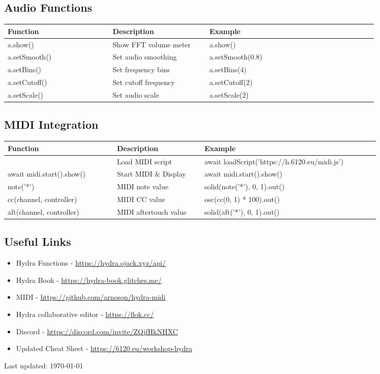 \documentclass[9pt,oneside]{amsart}
\begin{document}
\subsection*{Audio Functions}
\begin{tabular}{L{0.25\linewidth}L{0.23\linewidth}L{0.40\linewidth}}
\toprule
\textbf{Function} & \textbf{Description} & \textbf{Example} \\
\midrule
a.show() & Show FFT volume meter & a.show() \\
a.setSmooth() & Set audio smoothing & a.setSmooth(0.8) \\
a.setBins() & Set frequency bins & a.setBins(4) \\
a.setCutoff() & Set cutoff frequency & a.setCutoff(2) \\
a.setScale() & Set audio scale & a.setScale(2) \\
\bottomrule
\end{tabular}

\subsection*{MIDI Integration}
\begin{tabular}{L{0.25\linewidth}L{0.20\linewidth}L{0.40\linewidth}}
\toprule
\textbf{Function} & \textbf{Description} & \textbf{Example} \\
\midrule
 & Load MIDI script & await loadScript('https://h.6120.eu/midi.js') \\
await midi.start().show() & Start MIDI \& Display & await midi.start().show() \\
note('*') & MIDI note value & solid(note('*'), 0, 1).out() \\
cc(channel, controller) & MIDI CC value & osc(cc(0, 1) * 100).out() \\
aft(channel, controller) & MIDI aftertouch value & solid(aft('*'), 0, 1).out() \\
\bottomrule
\end{tabular}

\subsection*{Useful Links}
\begin{itemize}
\item Hydra Functions - \url{https://hydra.ojack.xyz/api/}
\item Hydra Book - \url{https://hydra-book.glitches.me/}
\item MIDI - \url{https://github.com/arnoson/hydra-midi}
\item Hydra collaborative editor - \url{https://flok.cc/}
\item Discord - \url{https://discord.com/invite/ZQjfHkNHXC}
\item Updated Cheat Sheet - \url{https://6120.eu/workshop-hydra}
\end{itemize}

Last updated: \today
\end{document}
